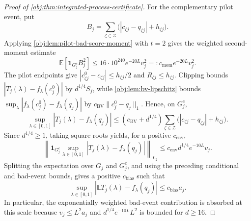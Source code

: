 \begin{proof}[Proof of \cref{obj:thm:integrated-process-certificate}]
For the complementary pilot event, put
\[
B_j=\sum_{\zeta\in\mathcal Z}
 \bigl(|c_{\zeta j}-q_{\zeta j}|+h_{\zeta j}\bigr).
\]
Applying \cref{obj:lem:pilot-bad-score-moment} with \(t=2\) gives the weighted second-moment estimate
\[
\mathbb E[\mathbf1_{G_j^c}B_j^2]
\leq 16\cdot10^{240}e^{-20L}v_j^2
=:c_{\mathrm{mom}}e^{-20L}v_j^2.
\]
The pilot endpoints give \(|c^0_{\zeta j}-c_{\zeta j}|\leq h_{\zeta j}/2\) and \(R_{\zeta j}\leq h_{\zeta j}\). Clipping bounds \(|T_j(\lambda)-f_\lambda(c_j^0)|\) by \(d^{1/4}S_j\), while \cref{obj:lem:bv-lipschitz} bounds \(\sup_\lambda|f_\lambda(c_j^0)-f_\lambda(q_j)|\) by \(c_{\mathrm{BV}}\|c_j^0-q_j\|_1\). Hence, on \(G_j^c\),
\[
\sup_{\lambda\in[0,1]}|T_j(\lambda)-f_\lambda(q_j)|
 \leq(c_{\mathrm{BV}}+d^{1/4})
 \sum_{\zeta\in\mathcal Z}
 \bigl(|c_{\zeta j}-q_{\zeta j}|+h_{\zeta j}\bigr).
\]
Since \(d^{1/4}\geq1\), taking square roots yields, for a positive \(c_{\mathrm{env}}\),
\[
\left\|\mathbf1_{G_j^c}
 \sup_{\lambda\in[0,1]}|T_j(\lambda)-f_\lambda(q_j)|
 \right\|_{L_2}
 \leq c_{\mathrm{env}}d^{1/4}e^{-10L}v_j.
\]
Splitting the expectation over \(G_j\) and \(G_j^c\), and using the preceding conditional and bad-event bounds, gives a positive \(c_{\mathrm{bias}}\) such that
\[
\sup_{\lambda\in[0,1]}
 \left|\mathbb ET_j(\lambda)-f_\lambda(q_j)\right|
 \leq c_{\mathrm{bias}}a_j.
\]
In particular, the exponentially weighted bad-event contribution is absorbed at this scale because \(v_j\leq L^2a_j\) and
\(d^{1/4}e^{-10L}L^2\) is bounded for \(d\geq16\). %


\end{proof}
